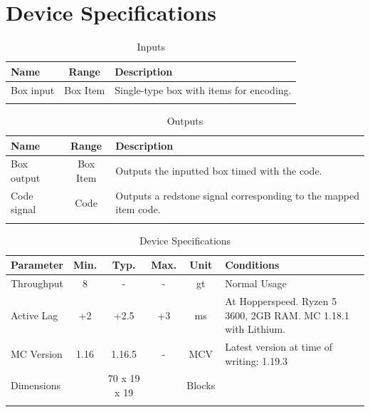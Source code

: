 \documentclass[10pt]{datasheet}
\begin{document}
\section{Device Specifications}

\begin{table}[h]
    \caption{Inputs}
    \begin{tabularx}{\textwidth}{l | c | X}
        \thickhline
        \textbf{Name} & \textbf{Range} & \textbf{Description} \\
        \hline
        Box input & Box Item & Single-type box with items for encoding. \\
        \thickhline
\end{tabularx}
\end{table}

\begin{table}[h]
    \caption{Outputs}
    \begin{tabularx}{\textwidth}{l | c | X}
        \thickhline
        \textbf{Name} & \textbf{Range} & \textbf{Description} \\
        \hline
        Box output & Box Item & Outputs the inputted box timed with the code. \\
        \hline
        Code signal & Code & Outputs a redstone signal corresponding to the mapped item code. \\
        \thickhline
\end{tabularx}
\end{table}

\begin{table}[h]
    \caption{Device Specifications}
    \begin{tabularx}{\textwidth}{l | c c c | c | X}
        \thickhline
        \textbf{Parameter} & \textbf{Min.} & \textbf{Typ.} & \textbf{Max.} &
        \textbf{Unit} & \textbf{Conditions} \\
        \hline
        Throughput  & 8 & - & - & gt & Normal Usage \\
        \hline
        Active Lag & +2 & +2.5 & +3 & ms & At Hopperspeed. Ryzen 5 3600, 2GB RAM. MC 1.18.1 with Lithium. \\
        \hline
        MC Version & 1.16 & 1.16.5 & - & MCV & Latest version at time of writing: 1.19.3\\
        \hline
        Dimensions & & 70 x 19 x 19 & & Blocks & \\
        \thickhline
\end{tabularx}
\end{table}
\newpage
\end{document}
